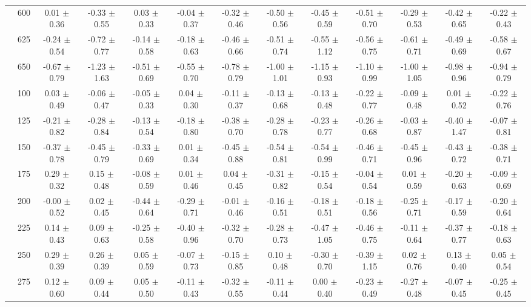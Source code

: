 \begin{table}[h]
{\begin{tabular}{
        ccccccccccccc}
 & 600& 0.01 $\pm$ 0.36& -0.33 $\pm$ 0.55& 0.03 $\pm$ 0.33& -0.04 $\pm$ 0.37& -0.32 $\pm$ 0.46& -0.50 $\pm$ 0.56& -0.45 $\pm$ 0.59& -0.51 $\pm$ 0.70& -0.29 $\pm$ 0.53& -0.42 $\pm$ 0.65& -0.22 $\pm$ 0.43 \\ 
 & 625& -0.24 $\pm$ 0.54& -0.72 $\pm$ 0.77& -0.14 $\pm$ 0.58& -0.18 $\pm$ 0.63& -0.46 $\pm$ 0.66& -0.51 $\pm$ 0.74& -0.55 $\pm$ 1.12& -0.56 $\pm$ 0.75& -0.61 $\pm$ 0.71& -0.49 $\pm$ 0.69& -0.58 $\pm$ 0.67 \\ 
 & 650& -0.67 $\pm$ 0.79& -1.23 $\pm$ 1.63& -0.51 $\pm$ 0.69& -0.55 $\pm$ 0.70& -0.78 $\pm$ 0.79& -1.00 $\pm$ 1.01& -1.15 $\pm$ 0.93& -1.10 $\pm$ 0.99& -1.00 $\pm$ 1.05& -0.98 $\pm$ 0.96& -0.94 $\pm$ 0.79 \\ \hline 
 & 100& 0.03 $\pm$ 0.49& -0.06 $\pm$ 0.47& -0.05 $\pm$ 0.33& 0.04 $\pm$ 0.30& -0.11 $\pm$ 0.37& -0.13 $\pm$ 0.68& -0.13 $\pm$ 0.48& -0.22 $\pm$ 0.77& -0.09 $\pm$ 0.48& 0.01 $\pm$ 0.52& -0.22 $\pm$ 0.76 \\ 
 & 125& -0.21 $\pm$ 0.82& -0.28 $\pm$ 0.84& -0.13 $\pm$ 0.54& -0.18 $\pm$ 0.80& -0.38 $\pm$ 0.70& -0.28 $\pm$ 0.78& -0.23 $\pm$ 0.77& -0.26 $\pm$ 0.68& -0.03 $\pm$ 0.87& -0.40 $\pm$ 1.47& -0.07 $\pm$ 0.81 \\ 
 & 150& -0.37 $\pm$ 0.78& -0.45 $\pm$ 0.79& -0.33 $\pm$ 0.69& 0.01 $\pm$ 0.34& -0.45 $\pm$ 0.88& -0.54 $\pm$ 0.81& -0.54 $\pm$ 0.99& -0.46 $\pm$ 0.71& -0.45 $\pm$ 0.96& -0.43 $\pm$ 0.72& -0.38 $\pm$ 0.71 \\ 
 & 175& 0.29 $\pm$ 0.32& 0.15 $\pm$ 0.48& -0.08 $\pm$ 0.59& 0.01 $\pm$ 0.46& 0.04 $\pm$ 0.45& -0.31 $\pm$ 0.82& -0.15 $\pm$ 0.54& -0.04 $\pm$ 0.54& 0.01 $\pm$ 0.59& -0.20 $\pm$ 0.63& -0.09 $\pm$ 0.69 \\ 
 & 200& -0.00 $\pm$ 0.52& 0.02 $\pm$ 0.45& -0.44 $\pm$ 0.64& -0.29 $\pm$ 0.71& -0.01 $\pm$ 0.46& -0.16 $\pm$ 0.51& -0.18 $\pm$ 0.51& -0.18 $\pm$ 0.56& -0.25 $\pm$ 0.71& -0.17 $\pm$ 0.59& -0.20 $\pm$ 0.64 \\ 
 & 225& 0.14 $\pm$ 0.43& 0.09 $\pm$ 0.63& -0.25 $\pm$ 0.58& -0.40 $\pm$ 0.96& -0.32 $\pm$ 0.70& -0.28 $\pm$ 0.73& -0.47 $\pm$ 1.05& -0.46 $\pm$ 0.75& -0.11 $\pm$ 0.64& -0.37 $\pm$ 0.77& -0.18 $\pm$ 0.63 \\ 
 & 250& 0.29 $\pm$ 0.39& 0.26 $\pm$ 0.39& 0.05 $\pm$ 0.59& -0.07 $\pm$ 0.73& -0.15 $\pm$ 0.85& 0.10 $\pm$ 0.48& -0.30 $\pm$ 0.70& -0.39 $\pm$ 1.15& 0.02 $\pm$ 0.76& 0.13 $\pm$ 0.40& 0.05 $\pm$ 0.54 \\ 
 & 275& 0.12 $\pm$ 0.60& 0.09 $\pm$ 0.44& 0.05 $\pm$ 0.50& -0.11 $\pm$ 0.43& -0.32 $\pm$ 0.55& -0.11 $\pm$ 0.44& 0.00 $\pm$ 0.40& -0.23 $\pm$ 0.49& -0.27 $\pm$ 0.48& -0.07 $\pm$ 0.45& -0.25 $\pm$ 0.45 \\ 

\end{tabular}}
\end{table}
